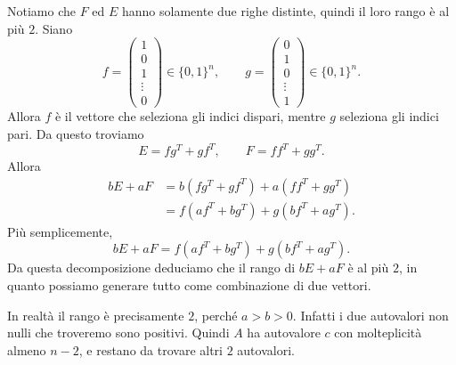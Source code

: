 \documentclass[a4paper]{article}
\begin{document}
\begin{snippetsolution}{}
    Notiamo che \(F\) ed \(E\) hanno solamente due righe distinte, quindi il loro
    rango è al più \(2\). Siano
    \[
        f =
        \begin{pmatrix}
            1 \\ 0 \\ 1 \\ \vdots \\ 0
        \end{pmatrix} \in \{0,1\}^n,
        \qquad
        g =
        \begin{pmatrix}
            0 \\ 1 \\ 0 \\ \vdots \\ 1
        \end{pmatrix}\in \{0,1\}^n.
    \]
    Allora \(f\) è il vettore che seleziona gli indici dispari, mentre \(g\)
    seleziona gli indici pari. Da questo troviamo
    \[
        E = fg^T + gf^T,
        \qquad
        F = ff^T + gg^T.
    \]
    Allora
    \begin{align*}
        bE + aF
        &=
        b\left(fg^T + gf^T\right)
        + a\left(ff^T + gg^T\right) \\
        &=
        f\left(af^T + bg^T\right)
        + g\left(bf^T + ag^T\right).
    \end{align*}
    Più semplicemente,
    \[
        bE+aF
        =
        f\left(af^T+bg^T\right)
        +
        g\left(bf^T+ag^T\right).
    \]
    Da questa decomposizione deduciamo che il rango di \(bE+aF\) è al più \(2\),
    in quanto possiamo generare tutto come combinazione di due vettori.

    In realtà il rango è precisamente \(2\), perché \(a>b>0\). Infatti i due
    autovalori non nulli che troveremo sono positivi. Quindi \(A\) ha autovalore
    \(c\) con molteplicità almeno \(n-2\), e restano da trovare altri \(2\)
    autovalori.


\end{snippetsolution}
\end{document}
